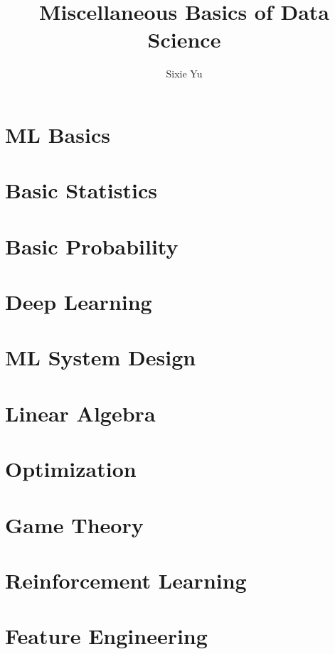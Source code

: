 \documentclass{article}
\title{Miscellaneous Basics of Data Science }
\author{Sixie Yu}
\date{ }
\begin{document}
\maketitle
\tableofcontents

\section{ML Basics}



\section{Basic Statistics}



\section{Basic Probability}
 

\section{Deep Learning}


\section{ML System Design}


\section{Linear Algebra}



\section{Optimization}



\section{Game Theory}



\section{Reinforcement Learning}



\section{Feature Engineering}





\end{document}
